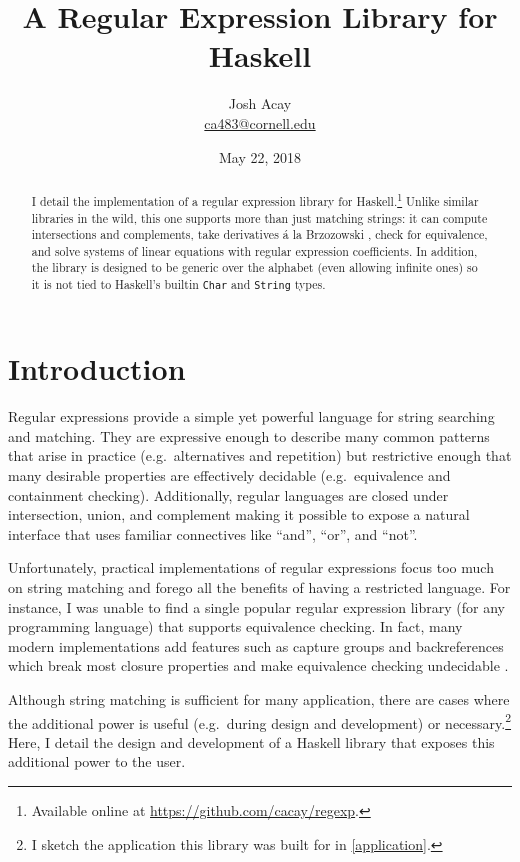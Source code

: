 \documentclass[11pt]{article}
\title{A Regular Expression Library for Haskell}
\author{Josh Acay \\ \href{mailto:ca483@cornell.edu}{ca483@cornell.edu}}
\date{May 22, 2018}
\newcommand{\haskell}{\lstinline}
\begin{document}
\maketitle

\begin{abstract}
  I detail the implementation of a regular expression library for Haskell.\footnote{%
    Available online at \url{https://github.com/cacay/regexp}.}
  Unlike similar libraries in the wild, this one supports more than just matching strings: it can compute intersections and complements, take derivatives \'a la Brzozowski \cite{Brzozowski64}, check for equivalence, and solve systems of linear equations with regular expression coefficients. In addition, the library is designed to be generic over the alphabet (even allowing infinite ones) so it is not tied to Haskell's builtin \haskell{Char} and \haskell{String} types.
\end{abstract}


\section{Introduction}
  Regular expressions provide a simple yet powerful language for string searching and matching. They are expressive enough to describe many common patterns that arise in practice (e.g.\ alternatives and repetition) but restrictive enough that many desirable properties are effectively decidable (e.g.\ equivalence and containment checking). Additionally, regular languages are closed under intersection, union, and complement making it possible to expose a natural interface that uses familiar connectives like ``and'', ``or'', and ``not''.

  Unfortunately, practical implementations of regular expressions focus too much on string matching and forego all the benefits of having a restricted language. For instance, I was
  unable to find a single popular regular expression library (for any programming language) that supports equivalence checking.
  In fact, many modern implementations add features such as capture groups and backreferences which break most closure properties and make equivalence checking undecidable \cite{CampeanuSY03}.

  Although string matching is sufficient for many application, there are cases where the additional power is useful (e.g.\ during design and development) or necessary.\footnote{%
    I sketch the application this library was built for in \cref{application}.}
  Here, I detail the design and development of a Haskell library that exposes this additional power to the user.
\end{document}
